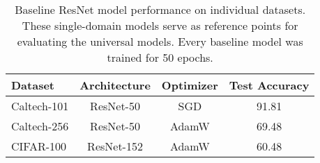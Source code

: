 \begin{table}[ht]
\centering
\caption{Baseline ResNet model performance on individual datasets. These single-domain models serve as reference points for evaluating the universal models. Every baseline model was trained for 50 epochs.}
\label{tab:baseline_model_results}
\begin{tabular}{lccc}
\toprule
Dataset & Architecture & Optimizer & Test Accuracy \\
\midrule
Caltech-101 & ResNet-50 & SGD & 91.81 \\
Caltech-256 & ResNet-50 & AdamW & 69.48 \\
CIFAR-100 & ResNet-152 & AdamW & 60.48 \\
\bottomrule
\end{tabular}
\end{table}

